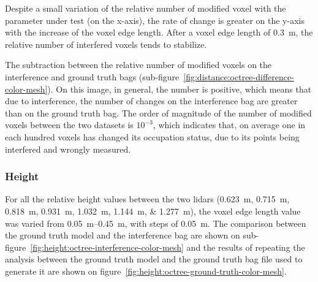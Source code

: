 Despite a small variation of the relative number of modified voxel with the parameter under test (on the x-axis), the rate of change is greater on the y-axis with the increase of the voxel edge length. After a voxel edge length of \SI{0.3}{\meter}, the relative number of interfered voxels tends to stabilize. 

The subtraction between the relative number of modified voxels on the interference and ground truth bags (sub-figure~\ref{fig:distance:octree-difference-color-mesh}). On this image, in general, the number is positive, which means that due to interference, the number of changes on the interference bag are greater than on the ground truth bag. The order of magnitude of the number of modified voxels between the two datasets is $10^{-3}$, which indicates that, on average one in each hundred voxels has changed its occupation status, due to its points being interfered and wrongly measured.


\subsubsection{Height}
For all the relative height values between the two \acp{lidar} (\SIlist[list-units=single]{0.623; 0.715; 0.818; 0.931; 1.032; 1.144; 1.277}{\meter}), the voxel edge length value was varied from \SIrange{0.05}{0.45}{\meter}, with steps of \SI{0.05}{\meter}. The comparison between the ground truth model and the interference bag are shown on sub-figure~\ref{fig:height:octree-interference-color-mesh} and the results of repeating the analysis between the ground truth model and the ground truth bag file used to generate it are shown on figure~\ref{fig:height:octree-ground-truth-color-mesh}.

